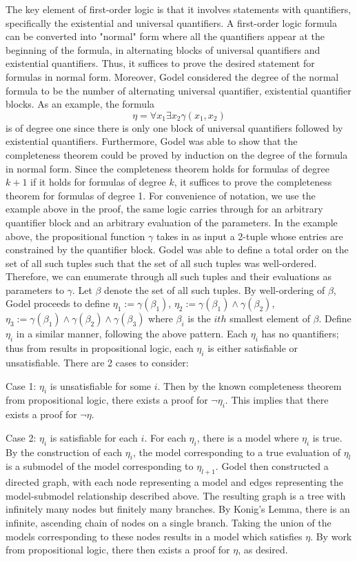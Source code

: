 \documentclass[%
 reprint,
 amsmath,amssymb,
 aps,
]{revtex4-2}
\begin{document}
The key element of first-order logic is that it involves statements with quantifiers, specifically the existential and universal quantifiers.  A first-order logic formula can be converted into "normal" form where all the quantifiers appear at the beginning of the formula, in alternating blocks of universal quantifiers and existential quantifiers.  Thus, it suffices to prove the desired statement for formulas in normal form.  Moreover, Godel considered the degree of the normal formula to be the number of alternating universal quantifier, existential quantifier blocks.  As an example, the formula
$$\eta = \forall x_1 \exists x_2 \gamma(x_1,x_2)$$
is of degree one since there is only one block of universal quantifiers followed by existential quantifiers.  Furthermore, Godel was able to show that the completeness theorem could be proved by induction on the degree of the formula in normal form.  Since the completeness theorem holds for formulas of degree $k+1$ if it holds for formulas of degree $k$, it suffices to prove the completeness theorem for formulas of degree 1.  For convenience of notation, we use the example above in the proof, the same logic carries through for an arbitrary quantifier block and an arbitrary evaluation of the parameters.  In the example above, the propositional function $\gamma$ takes in as input a 2-tuple whose entries are constrained by the quantifier block.  Godel was able to define a total order on the set of all such tuples such that the set of all such tuples was well-ordered.  Therefore, we can enumerate through all such tuples and their evaluations as parameters to $\gamma$. Let $\beta$ denote the set of all such tuples.  By well-ordering of $\beta$, Godel proceeds to define $\eta_1 := \gamma(\beta_1)$, $\eta_2 := \gamma(\beta_1)  \land \gamma(\beta_2)$, $\eta_3 := \gamma(\beta_1)  \land \gamma(\beta_2) \land \gamma(\beta_3)$ where $\beta_i$ is the $ith$ smallest element of $\beta$.  Define $\eta_i$ in a similar manner, following the above pattern.  Each $\eta_i$ has no quantifiers; thus from results in propositional logic, each $\eta_i$ is either satisfiable or unsatisfiable.  There are 2 cases to consider:

Case 1:
$\eta_i$ is unsatisfiable for some $i$.  Then by the known completeness theorem from propositional logic, there exists a proof for $\neg \eta_i$.  This implies that there exists a proof for $\neg \eta$.  

Case 2:
$\eta_i$ is satisfiable for each $i$.  For each $\eta_i$, there is a model where $\eta_i$ is true.  By the construction of each $\eta_i$, the model corresponding to a true evaluation of $\eta_l$ is a submodel of the model corresponding to $\eta_{l+1}$.  Godel then constructed a directed graph, with each node  representing a model and edges representing the model-submodel relationship described above.  The resulting graph is a tree with infinitely many nodes but finitely many branches.  By Konig's Lemma, there is an infinite, ascending chain of nodes on a single branch.  Taking the union of the models corresponding to these nodes results in a model which satisfies $\eta$.  By work from propositional logic, there then exists a proof for $\eta$, as desired.   
\end{document}
